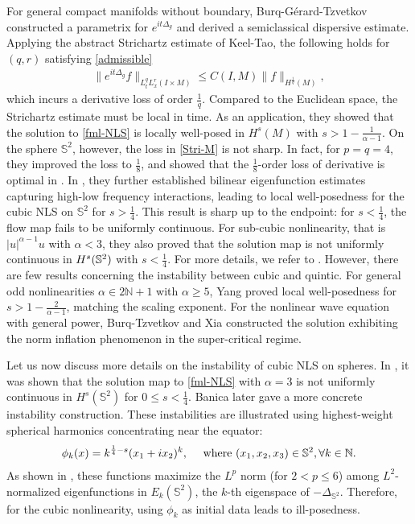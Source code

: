 \documentclass[10pt,a4paper]{amsart}
\numberwithin{equation}{section}
\newcommand{\N}{\mathbb N}
\begin{document}
For general compact manifolds without boundary, Burq-G\'erard-Tzvetkov \cite{Burq1} constructed a parametrix for $e^{it\Delta_g}$ and derived a semiclassical dispersive estimate. Applying the abstract Strichartz estimate of Keel-Tao, the following holds for $(q,r)$ satisfying \eqref{admissible}
\begin{align}\label{Stri-M}
\big\|e^{it\Delta_g}f\big\|_{L_t^qL_x^r(I\times M)}\leq C(I,M)\|f\|_{H^\frac1q(M)}, 
\end{align} 
which incurs a derivative loss of order $\frac1q$. Compared to the Euclidean space, the Strichartz estimate must be local in time. As an application, they showed that the solution to \eqref{fml-NLS} is locally well-posed in $H^s(M)$ with $s>1-\frac{1}{\alpha-1}$.  On the sphere $\mathbb{S}^2$, however, the loss in \eqref{Stri-M} is not  sharp. In fact, for $p = q = 4$, they improved the loss to $\frac18$, and showed that the $\frac{1}{8}$-order  loss of derivative is optimal in \cite{Burq1}. In \cite{Burq2}, they further established bilinear eigenfunction estimates capturing high-low frequency interactions, leading to local well-posedness for the cubic NLS on $\mathbb{S}^2$ for $s > \frac14$. This 
result is sharp up to the endpoint: for $s < \frac14$, the flow map fails to be uniformly continuous. For sub-cubic nonlinearity, that is $|u|^{\alpha-1}u$ with $\alpha<3$, they also proved that the solution map is not uniformly continuous in $H^s(\Bbb S^2)$ with $s<\frac{1}{4}$. For more details, we refer to \cite{GerardICM}. However, there are few results concerning the instability between cubic and quintic. For general odd nonlinearities $\alpha \in 2\N+1$ with $\alpha \geq 5$, Yang \cite{Yang} proved local well-posedness for $s > 1 - \frac{2}{\alpha-1}$, matching the scaling exponent. For the nonlinear wave equation with general power, Burq-Tzvetkov \cite{Burq-Tzvektov} and Xia \cite{Xia} constructed the solution exhibiting the norm inflation phenomenon in the super-critical regime. 

	

	
Let us now discuss more details on the instability of cubic NLS on spheres.  In \cite{Burq2001}, it was shown that the solution map to \eqref{fml-NLS}  with $\alpha=3$ is not uniformly continuous in $H^s(\mathbb{S}^2)$ for $0 \leq s < \frac14$. Banica \cite{Banica} later gave a more concrete instability construction. These instabilities are illustrated using highest-weight spherical harmonics concentrating near the equator:
\begin{align}
\phi_k(x)=k^{\frac{1}{4}-s}(x_1+ix_2)^k,\quad\text{ where }(x_1,x_2,x_3)\in\Bbb{S}^2,\forall k\in\Bbb{N}.
\end{align}
As shown in \cite{Han-JGA}, these functions maximize the $L^p$ norm (for $2 < p \le 6$) among $L^2$-normalized eigenfunctions in $E_k(\mathbb{S}^2)$, the $k$-th eigenspace of $-\Delta_{\mathbb{S}^2}$. Therefore, for the cubic nonlinearity,  using $\phi_k$ as initial data leads to ill-posedness.
	
\end{document}
